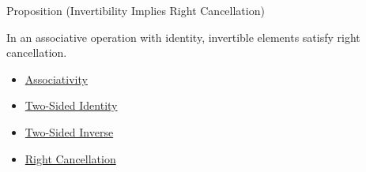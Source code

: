 \begin{propositionbox}{Proposition (Invertibility Implies Right Cancellation)}
\begin{proposition}
\label{prop:invertibility-implies-right-cancellation}
In an associative operation with identity, invertible elements satisfy right
cancellation.
\end{proposition}
\end{propositionbox}

\begin{dependencies}
\begin{itemize}
  \item \hyperref[def:associativity]{Associativity}
  \item \hyperref[def:two-sided-identity]{Two-Sided Identity}
  \item \hyperref[def:two-sided-inverse]{Two-Sided Inverse}
  \item \hyperref[def:right-cancellation]{Right Cancellation}
\end{itemize}
\end{dependencies}
